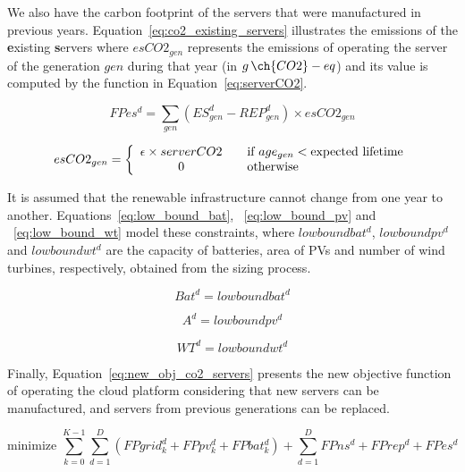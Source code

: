 We also have the carbon footprint of the servers that were manufactured in previous years. Equation~\eqref{eq:co2_existing_servers} illustrates the emissions of the \textbf{e}xisting \textbf{s}ervers where $esCO2_{gen}$ represents the emissions of operating the server of the generation $gen$ during that year (in $g\,\ch{CO2}-eq$) and its value is computed by the function in Equation~\eqref{eq:serverCO2}.


\begin{equation} \label{eq:co2_existing_servers}
FPes^d = \sum_{gen} (ES_{gen}^d - REP_{gen}^d)  \times esCO2_{gen}
\end{equation}


\begin{equation} \label{eq:serverCO2}
esCO2_{gen} =  \left\{ 
  \begin{array}{ c l }
    \epsilon \times serverCO2   & \quad \textrm{if $age_{gen}$}    < \textrm{expected lifetime}   \\
    0     & \quad \textrm{otherwise  } \\
  \end{array}
\right.
\end{equation}

It is assumed that the renewable infrastructure cannot change from one year to another. Equations~\eqref{eq:low_bound_bat},  ~\eqref{eq:low_bound_pv} and ~\eqref{eq:low_bound_wt} model these constraints, where $lowboundbat^d$, $lowboundpv^d$ and $lowboundwt^d$ are the capacity of batteries, area of PVs and number of wind turbines, respectively, obtained from the sizing process.

\begin{equation} \label{eq:low_bound_bat}
Bat^d = lowboundbat^d
\end{equation}

\begin{equation} \label{eq:low_bound_pv}
A^d = lowboundpv^d
\end{equation}

\begin{equation} \label{eq:low_bound_wt}
WT^d = lowboundwt^d
\end{equation}


Finally, Equation~\eqref{eq:new_obj_co2_servers} presents the new objective function of operating the cloud platform considering that new servers can be manufactured, and servers from previous generations can be replaced.

\begin{equation} \label{eq:new_obj_co2_servers}
\text{minimize }\sum_{k=0}^{K-1} \sum_{d=1}^D (FPgrid^d_k +  FPpv^d_k + FPbat^d_k) + \sum_{d=1}^D   FPns^d + FPrep^d + FPes^d 
\end{equation}



